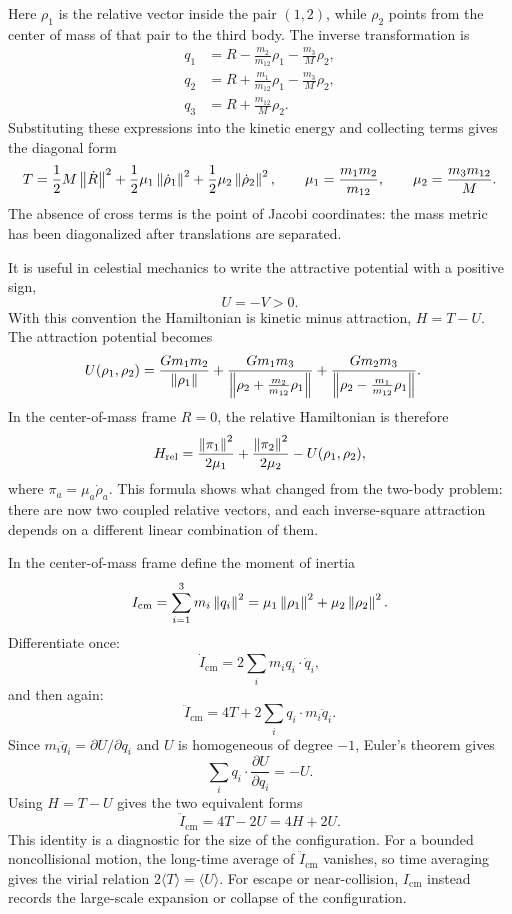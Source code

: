 Here \(\rho_1\) is the relative vector inside the pair \((1,2)\), while
\(\rho_2\) points from the center of mass of that pair to the third body.  The
inverse transformation is
\[
\begin{aligned}
  q_1&=R-\frac{m_2}{m_{12}}\rho_1-\frac{m_3}{M}\rho_2,\\
  q_2&=R+\frac{m_1}{m_{12}}\rho_1-\frac{m_3}{M}\rho_2,\\
  q_3&=R+\frac{m_{12}}{M}\rho_2 .
\end{aligned}
\]
Substituting these expressions into the kinetic energy and collecting terms
gives the diagonal form
\[
  T=
  \frac12 M\left\lVert \dot R\right\rVert^2
  +\frac12\mu_1\left\lVert \dot\rho_1\right\rVert^2
  +\frac12\mu_2\left\lVert \dot\rho_2\right\rVert^2,
  \qquad
  \mu_1=\frac{m_1m_2}{m_{12}},
  \qquad
  \mu_2=\frac{m_3m_{12}}{M}.
\]
The absence of cross terms is the point of Jacobi coordinates: the mass metric
has been diagonalized after translations are separated.

It is useful in celestial mechanics to write the attractive potential with a
positive sign,
\[
  U=-V>0.
\]
With this convention the Hamiltonian is kinetic minus attraction, \(H=T-U\).
The attraction potential becomes
\[
\begin{aligned}
  U(\rho_1,\rho_2)
  &=
  \frac{Gm_1m_2}{\left\lVert \rho_1\right\rVert}
  +\frac{Gm_1m_3}
  {\left\lVert \rho_2+\frac{m_2}{m_{12}}\rho_1\right\rVert}
  +\frac{Gm_2m_3}
  {\left\lVert \rho_2-\frac{m_1}{m_{12}}\rho_1\right\rVert} .
\end{aligned}
\]
In the center-of-mass frame \(R=0\), the relative Hamiltonian is therefore
\[
  H_{\mathrm{rel}}
  =
  \frac{\left\lVert \pi_1\right\rVert^2}{2\mu_1}
  +\frac{\left\lVert \pi_2\right\rVert^2}{2\mu_2}
  -U(\rho_1,\rho_2),
\]
where \(\pi_a=\mu_a\dot\rho_a\).  This formula shows what
changed from the two-body problem: there are now two coupled relative vectors,
and each inverse-square attraction depends on a different linear combination of
them.

\begin{derivation}
In the center-of-mass frame define the moment of inertia
\[
  I_{\mathrm{cm}}
  =
  \sum_{i=1}^3 m_i\left\lVert q_i\right\rVert^2
  =
  \mu_1\left\lVert \rho_1\right\rVert^2+\mu_2\left\lVert \rho_2\right\rVert^2 .
\]
Differentiate once:
\[
  \dot I_{\mathrm{cm}}
  =
  2\sum_i m_i q_i\cdot\dot q_i,
\]
and then again:
\[
  \ddot I_{\mathrm{cm}}
  =
  4T+2\sum_i q_i\cdot m_i\ddot q_i .
\]
Since \(m_i\ddot q_i=\partial U/\partial q_i\) and \(U\) is homogeneous of
degree \(-1\), Euler's theorem gives
\[
  \sum_i q_i\cdot\frac{\partial U}{\partial q_i}=-U.
\]
Using \(H=T-U\) gives the two equivalent forms
\[
  \boxed{\ddot I_{\mathrm{cm}}=4T-2U=4H+2U.}
\]
This identity is a diagnostic for the size of the configuration. For a bounded
noncollisional motion, the long-time average of \(\ddot I_{\mathrm{cm}}\)
vanishes, so time averaging gives the virial relation
\(2\langle T\rangle=\langle U\rangle\).
For escape or near-collision, \(I_{\mathrm{cm}}\) instead records the large-scale
expansion or collapse of the configuration.
\end{derivation}


